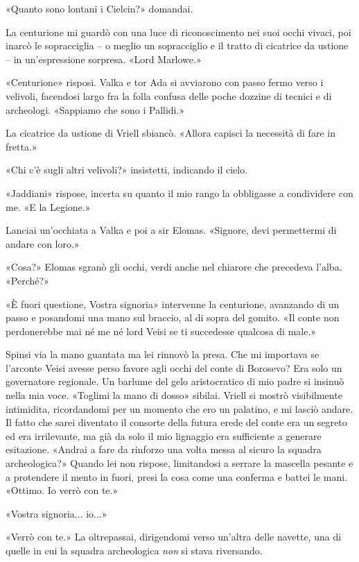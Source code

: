 «Quanto sono lontani i Cielcin?» domandai.

La centurione mi guardò con una luce di riconoscimento nei suoi occhi
vivaci, poi inarcò le sopracciglia -- o meglio un sopracciglio e il
tratto di cicatrice da ustione -- in un'espressione sorpresa. «Lord
Marlowe.»

«Centurione» risposi. Valka e tor Ada si avviarono con passo fermo verso
i velivoli, facendosi largo fra la folla confusa delle poche dozzine di
tecnici e di archeologi. «Sappiamo che sono i Pallidi.»

La cicatrice da ustione di Vriell sbiancò. «Allora capisci la necessità
di fare in fretta.»

«Chi c'è sugli altri velivoli?» insistetti, indicando il cielo.

«Jaddiani» rispose, incerta su quanto il mio rango la obbligasse a
condividere con me. «E la Legione.»

Lanciai un'occhiata a Valka e poi a sir Elomas. «Signore, devi
permettermi di andare con loro.»

«Cosa?» Elomas sgranò gli occhi, verdi anche nel chiarore che precedeva
l'alba. «Perché?»

«È fuori questione, Vostra signoria» intervenne la centurione, avanzando
di un passo e posandomi una mano sul braccio, al di sopra del gomito.
«Il conte non perdonerebbe mai né me né lord Veisi se ti succedesse
qualcosa di male.»

Spinsi via la mano guantata ma lei rinnovò la presa. Che mi importava se
l'arconte Veisi avesse perso favore agli occhi del conte di Borosevo?
Era solo un governatore regionale. Un barlume del gelo aristocratico di
mio padre si insinuò nella mia voce. «Toglimi la mano di dosso» sibilai.
Vriell si mostrò visibilmente intimidita, ricordandomi per un momento
che ero un palatino, e mi lasciò andare. Il fatto che sarei diventato il
consorte della futura erede del conte era un segreto ed era irrilevante,
ma già da solo il mio lignaggio era sufficiente a generare esitazione.
«Andrai a fare da rinforzo una volta messa al sicuro la squadra
archeologica?» Quando lei non rispose, limitandosi a serrare la mascella
pesante e a protendere il mento in fuori, presi la cosa come una
conferma e battei le mani. «Ottimo. Io verrò con te.»

«Vostra signoria... io...»

«Verrò con te.» La oltrepassai, dirigendomi verso un'altra delle
navette, una di quelle in cui la squadra archeologica \emph{non} si
stava riversando.

